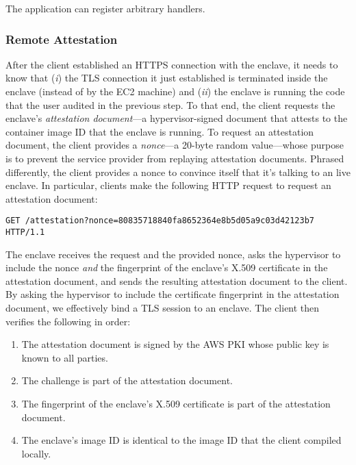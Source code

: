 The application can register arbitrary handlers.


\subsubsection{Remote Attestation}
\label{sec:attestation}

After the client established an HTTPS connection with the enclave, it needs to know that (\emph{i}) the TLS connection it just established is terminated inside the enclave (instead of by the EC2 machine) and (\emph{ii}) the enclave is running the code that the user audited in the previous step.  To that end, the client requests the enclave's \emph{attestation document}---a hypervisor-signed document that attests to the container image ID that the enclave is running.  To request an attestation document, the client provides a \emph{nonce}---a 20-byte random value---whose purpose is to prevent the service provider from replaying attestation documents.  Phrased differently, the client provides a nonce to convince itself that it's talking to an live enclave.  In particular, clients make the following HTTP request to request an attestation document:

\begin{lstlisting}
GET /attestation?nonce=80835718840fa8652364e8b5d05a9c03d42123b7 HTTP/1.1
\end{lstlisting}

The enclave receives the request and the provided nonce, asks the hypervisor to include the nonce \emph{and} the fingerprint of the enclave's X.509 certificate in the attestation document, and sends the resulting attestation document to the client.  By asking the hypervisor to include the certificate fingerprint in the attestation document, we effectively bind a TLS session to an enclave.  The client then verifies the following in order:

\begin{enumerate}
    \item The attestation document is signed by the AWS PKI whose public key is known to all parties.
    \item The challenge is part of the attestation document.
    \item The fingerprint of the enclave's X.509 certificate is part of the attestation document.
    \item The enclave's image ID is identical to the image ID that the client compiled locally.
\end{enumerate}

